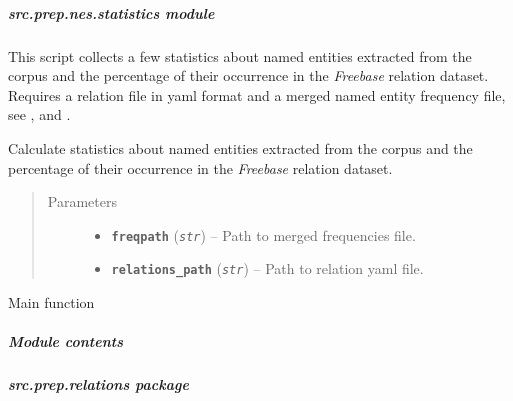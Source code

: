 \documentclass[letterpaper,10pt,english]{sphinxmanual}
\begin{document}
\subparagraph{src.prep.nes.statistics module}
\label{src.prep.nes:src-prep-nes-statistics-module}\label{src.prep.nes:module-src.prep.nes.statistics}
This script collects a few statistics about named entities extracted from the corpus and the percentage of their
occurrence in the \emph{Freebase} relation dataset.
Requires a relation file in yaml format and a merged named entity frequency file, see ,
 and  .

\begin{fulllineitems}
\label{src.prep.nes:src.prep.nes.statistics.calculate_occurrences}
Calculate statistics about named entities extracted from the corpus and the percentage of their
occurrence in the \emph{Freebase} relation dataset.
\begin{quote}\begin{description}
\item[{Parameters}] \leavevmode\begin{itemize}
\item {} 
\textbf{\texttt{freqpath}} (\emph{\texttt{str}}) -- Path to merged frequencies file.

\item {} 
\textbf{\texttt{relations\_path}} (\emph{\texttt{str}}) -- Path to relation yaml file.

\end{itemize}

\end{description}\end{quote}

\end{fulllineitems}


\begin{fulllineitems}
\label{src.prep.nes:src.prep.nes.statistics.main}
Main function

\end{fulllineitems}



\subparagraph{Module contents}
\label{src.prep.nes:module-src.prep.nes}\label{src.prep.nes:module-contents}

\subparagraph{src.prep.relations package}
\label{src.prep.relations:src-prep-relations-package}\label{src.prep.relations::doc}
\end{document}
